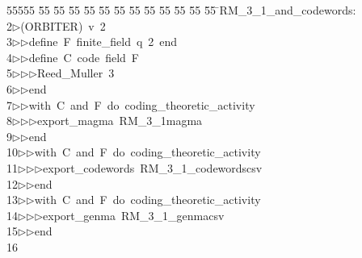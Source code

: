 %
%
\begin{tabbing}
55555 \= 55 \= 55 \= 55 \= 55 \= 55 \= 55 \= 55 \= 55 \= 55 \= 55 \= 55 \= 55 \= \>RM\_3\_1\_and\_codewords:\\[0pt]
2\>$\triangleright$\>(ORBITER)\ v\ 2\ \\[0pt]
3\>$\triangleright$\>$\triangleright$\>define\ F\ finite\_field\ q\ 2\ end\ \\[0pt]
4\>$\triangleright$\>$\triangleright$\>define\ C\ code\ field\ F\ \\[0pt]
5\>$\triangleright$\>$\triangleright$\>$\triangleright$\>Reed\_Muller\ 3\ \\[0pt]
6\>$\triangleright$\>$\triangleright$\>end\ \\[0pt]
7\>$\triangleright$\>$\triangleright$\>with\ C\ and\ F\ do\ coding\_theoretic\_activity\ \\[0pt]
8\>$\triangleright$\>$\triangleright$\>$\triangleright$\>export\_magma\ RM\_3\_1magma\ \\[0pt]
9\>$\triangleright$\>$\triangleright$\>end\ \\[0pt]
10\>$\triangleright$\>$\triangleright$\>with\ C\ and\ F\ do\ coding\_theoretic\_activity\ \\[0pt]
11\>$\triangleright$\>$\triangleright$\>$\triangleright$\>export\_codewords\ RM\_3\_1\_codewordscsv\ \\[0pt]
12\>$\triangleright$\>$\triangleright$\>end\ \\[0pt]
13\>$\triangleright$\>$\triangleright$\>with\ C\ and\ F\ do\ coding\_theoretic\_activity\ \\[0pt]
14\>$\triangleright$\>$\triangleright$\>$\triangleright$\>export\_genma\ RM\_3\_1\_genmacsv\ \\[0pt]
15\>$\triangleright$\>$\triangleright$\>end\ \\[0pt]
16\>\end{tabbing}
